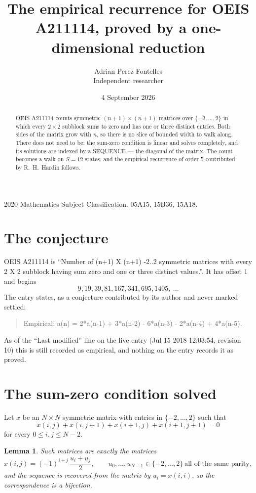 \documentclass[11pt,a4paper]{article}
\title{The empirical recurrence for OEIS A211114, proved by a one-dimensional reduction}
\author{Adrian Perez Fontelles\\ \small Independent researcher}
\date{4 September 2026}
\theoremstyle{plain}
\newtheorem{lemma}[theorem]{Lemma}
\theoremstyle{definition}
\begin{document}
\maketitle

\begin{abstract}
OEIS A211114 counts symmetric $(n+1)\times(n+1)$ matrices over
$\{-2,\dots,2\}$ in which every $2\times2$ subblock sums to zero and has one or three distinct
entries. Both sides of the matrix grow with $n$, so there is no slice of bounded width to walk
along. There does not need to be: the sum-zero condition is linear and solves completely, and
its solutions are indexed by a SEQUENCE --- the diagonal of the matrix. The count becomes a walk
on $S=12$ states, and the empirical recurrence of order $5$ contributed by R.~H.~Hardin
follows.
\end{abstract}

\noindent\small 2020 Mathematics Subject Classification. 05A15, 15B36, 15A18.\normalsize

\section{The conjecture}

OEIS A211114 is ``Number of (n+1) X (n+1) -2..2 symmetric matrices with every 2 X 2 subblock having sum zero and one or three distinct values.''. It has offset $1$ and begins
\[
9, 19, 39, 81, 167, 341, 695, 1405,\ \dots
\]
The entry states, as a conjecture contributed by its author and never marked settled:
\begin{quote}
Empirical: a(n) = 2*a(n-1) + 3*a(n-2) - 6*a(n-3) - 2*a(n-4) + 4*a(n-5).
\end{quote}
As of the ``Last modified'' line on the live entry (Jul 15 2018 12:03:54, revision 10) this is still
recorded as empirical, and nothing on the entry records it as proved.

\section{The sum-zero condition solved}

Let $x$ be an $N\times N$ symmetric matrix with entries in $\{-2,\dots,2\}$ such that
\[
x(i,j)+x(i,j{+}1)+x(i{+}1,j)+x(i{+}1,j{+}1)=0
\]
for every $0\le i,j\le N-2$.

\begin{lemma}\label{lem:solve}
Such matrices are exactly the matrices
\[
x(i,j)=(-1)^{i+j}\,\frac{u_i+u_j}{2},
\qquad u_0,\dots,u_{N-1}\in\{-2,\dots,2\}\ \text{all of the same parity},
\]
and the sequence is recovered from the matrix by $u_i=x(i,i)$, so the correspondence is a
bijection.
\end{lemma}
\end{document}
